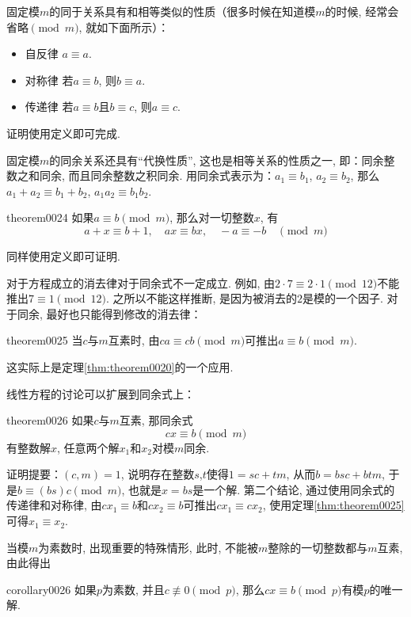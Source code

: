 固定模$m$的同于关系具有和相等类似的性质（很多时候在知道模$m$的时候, 经常会省略$\pmod{m}$, 就如下面所示）：
\begin{itemize}
\item 自反律 $a \equiv a$.
\item 对称律 若$a \equiv b$, 则$b \equiv a$.
\item 传递律 若$a \equiv b$且$b \equiv c$, 则$a \equiv c$.
\end{itemize}
证明使用定义即可完成. 

固定模$m$的同余关系还具有“代换性质”, 这也是相等关系的性质之一, 即：同余整数之和同余, 而且同余整数之积同余. 用同余式表示为：$a_1 \equiv b_1$, $a_2 \equiv b_2$, 那么$a_1+a_2 \equiv b_1+b_2$, $a_1a_2 \equiv b_1b_2$. 
\begin{theorem}{}{theorem0024}
如果$a \equiv b \pmod{m}$, 那么对一切整数$x$, 有
\[
a+x \equiv b+1, \quad ax \equiv bx, \quad  -a \equiv -b \quad \pmod{m}
\]
\end{theorem}

同样使用定义即可证明. 

对于方程成立的消去律对于同余式不一定成立. 例如, 由$2 \cdot 7 \equiv 2 \cdot 1 \pmod{12}$不能推出$7 \equiv 1 \pmod{12}$. 之所以不能这样推断, 是因为被消去的$2$是模的一个因子. 对于同余, 最好也只能得到修改的消去律：
\begin{theorem}{}{theorem0025}
当$c$与$m$互素时, 由$ca \equiv cb \pmod{m}$可推出$a \equiv b \pmod{m}$. 
\end{theorem}

这实际上是定理\ref{thm:theorem0020}的一个应用. 

线性方程的讨论可以扩展到同余式上：
\begin{theorem}{}{theorem0026}
如果$c$与$m$互素, 那同余式
\[
cx \equiv b \pmod{m}
\]
有整数解$x$, 任意两个解$x_1$和$x_2$对模$m$同余. 
\end{theorem}

证明提要：$(c,m)=1$, 说明存在整数$s$,$t$使得$1 = sc+tm$, 从而$b = bsc + btm$, 于是$b \equiv (bs)c \pmod{m}$, 也就是$x=bs$是一个解. 第二个结论, 通过使用同余式的传递律和对称律, 由$cx_1 \equiv b$和$cx_2 \equiv b$可推出$cx_1 \equiv cx_2$, 使用定理\ref{thm:theorem0025}可得$x_1 \equiv x_2$. 

当模$m$为素数时, 出现重要的特殊情形, 此时, 不能被$m$整除的一切整数都与$m$互素, 由此得出
\begin{corollary}{}{corollary0026}
如果$p$为素数, 并且$c \not\equiv 0 \pmod{p}$, 那么$cx \equiv b \pmod{p}$有模$p$的唯一解. 
\end{corollary}

